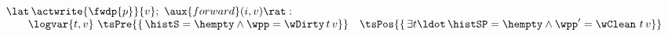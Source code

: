

\[
\begin{array}{l}
  \lat\, \actwrite{\fwdp{p}}{v};\ \aux{forward}(i,v)\rat :\\
  ~~~~~~ \logvar{t,v}\
  \tsPre{\{\, \histS = \hempty \wedge  \wpp = \wDirty\, t\, v\}}\quad 
  \tsPos{\{\, \exists t\ldot\, \histSP = \hempty \wedge
    \wpp' = \wClean\ t\, v \}}
\end{array}
\]


